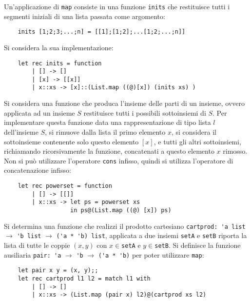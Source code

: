 \documentclass{article}
\numberwithin{equation}{subsection}
\begin{document}
Un'applicazione di \verb|map| consiste in una funzione \verb|inits| che restituisce tutti i segmenti iniziali di una lista passata come argomento:
\begin{verbatim}
    inits [1;2;3;...;n] = [[1];[1;2];...[1;2;...;n]]
\end{verbatim}
Si considera la sua implementazione:
\begin{verbatim}
    let rec inits = function
        | [] -> []
        | [x] -> [[x]]
        | x::xs -> [x]::(List.map ((@)[x]) (inits xs) )
\end{verbatim}

Si considera una funzione che produca l'insieme delle parti di un insieme, ovvero applicata ad un insieme $S$ restituisce tutti i possibili sottoinsiemi di $S$. 
Per implementare questa funzione data una rappresentazione di tipo lista $l$ dell'insieme $S$, si rimuove dalla lista il primo elemento $x$, si considera il sottoinsieme contenente solo questo elemento $[x]$, e tutti gli altri sottoinsiemi, richiamando ricorsivamente la funzione, concatenati a questo elemento $x$ rimosso. 
Non si può utilizzare l'operatore \verb|cons| infisso, quindi si utilizza l'operatore di concatenazione infisso: %
\begin{verbatim}
    let rec powerset = function
        | [] -> [[]]
        | x::xs -> let ps = powerset xs
                   in ps@(List.map ((@) [x]) ps)
\end{verbatim}

Si determina una funzione che realizzi il prodotto cartesiano \verb|cartprod: 'a list| $\rightarrow$ \verb|'b list| $\rightarrow$ \verb|('a * 'b) list|, applicata a due insiemi \verb|setA| e \verb|setB| riporta la lista di tutte le coppie $(x,y)$ con $x\in$\verb|setA| e $y\in$\verb|setB|. Si definisce la funzione ausiliaria \verb|pair: 'a| $\rightarrow$ \verb|'b| $\rightarrow$ \verb|('a * 'b)| per poter utilizzare \verb|map|:
\begin{verbatim}
    let pair x y = (x, y);;
    let rec cartprod l1 l2 = match l1 with
        | [] -> []
        | x::xs -> (List.map (pair x) l2)@(cartprod xs l2)
\end{verbatim}
\end{document}
